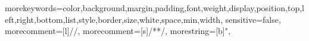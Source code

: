 
{morekeywords={color,background,margin,padding,font,weight,display,position,top,left,right,bottom,list,style,border,size,white,space,min,width},
sensitive=false, 
morecomment=[l]{//}, 
morecomment=[s]{/*}{*/}, 
morestring=[b]", 
} 
 

